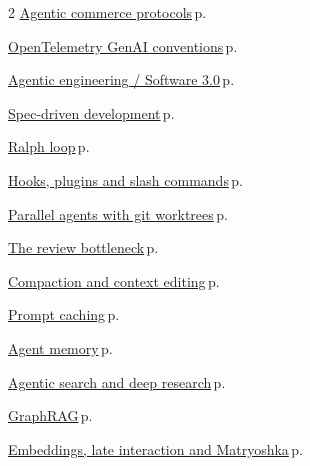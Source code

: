 \documentclass[10pt,a4paper,openany]{report}
\begin{document}
\begin{multicols}{2}
\hyperref[c:protocols-9]{Agentic commerce protocols}\,{\color{muted}\scriptsize p.\,\pageref{c:protocols-9}}\par\vspace{1pt}
\hyperref[c:protocols-11]{OpenTelemetry GenAI conventions}\,{\color{muted}\scriptsize p.\,\pageref{c:protocols-11}}\par\vspace{1pt}
\hyperref[c:coding-2]{Agentic engineering / Software 3.0}\,{\color{muted}\scriptsize p.\,\pageref{c:coding-2}}\par\vspace{1pt}
\hyperref[c:coding-3]{Spec-driven development}\,{\color{muted}\scriptsize p.\,\pageref{c:coding-3}}\par\vspace{1pt}
\hyperref[c:coding-4]{Ralph loop}\,{\color{muted}\scriptsize p.\,\pageref{c:coding-4}}\par\vspace{1pt}
\hyperref[c:coding-5]{Hooks, plugins and slash commands}\,{\color{muted}\scriptsize p.\,\pageref{c:coding-5}}\par\vspace{1pt}
\hyperref[c:coding-6]{Parallel agents with git worktrees}\,{\color{muted}\scriptsize p.\,\pageref{c:coding-6}}\par\vspace{1pt}
\hyperref[c:coding-7]{The review bottleneck}\,{\color{muted}\scriptsize p.\,\pageref{c:coding-7}}\par\vspace{1pt}
\hyperref[c:context-2]{Compaction and context editing}\,{\color{muted}\scriptsize p.\,\pageref{c:context-2}}\par\vspace{1pt}
\hyperref[c:context-3]{Prompt caching}\,{\color{muted}\scriptsize p.\,\pageref{c:context-3}}\par\vspace{1pt}
\hyperref[c:context-4]{Agent memory}\,{\color{muted}\scriptsize p.\,\pageref{c:context-4}}\par\vspace{1pt}
\hyperref[c:context-6]{Agentic search and deep research}\,{\color{muted}\scriptsize p.\,\pageref{c:context-6}}\par\vspace{1pt}
\hyperref[c:context-7]{GraphRAG}\,{\color{muted}\scriptsize p.\,\pageref{c:context-7}}\par\vspace{1pt}
\hyperref[c:context-8]{Embeddings, late interaction and Matryoshka}\,{\color{muted}\scriptsize p.\,\pageref{c:context-8}}\par\vspace{1pt}

\end{multicols}
\end{document}
